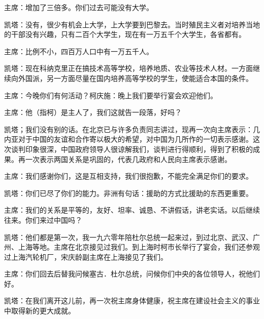主席：增加了三倍多。你们过去可能没有大学。

凯塔：没有，很少有机会上大学，上大学要到巴黎去。当时殖民主义者对培养当地的干部没有兴趣，只有二百个大学生，现在有一万五千个大学生，各省都有。

主席：比例不小，四百万人口中有一万五千人。

凯塔：现在科纳克里正在搞技术高等学校，培养地质、农业等技术人材。一方面继续向外国派，另一方面尽量在国内培养高等学校的学生，使能适合本国的条件。

主席：今晚你们有何活动？柯庆施：晚上我们要举行宴会欢迎他们。

主席：他（指柯）是主人了，我们这就告一段落，好吗？

凯塔；我们没有别的话。在北京已与许多负责同志讲过，现再一次向主席表示：几内亚对于中国的友谊和合作寄以极大的希望，对中国为几所作的一切表示感谢。这次谈判印象很深，中国政府领导人很谅解我们，谈判进行得顺利，得到了积极的成果。再一次表示两国关系是巩固的，代表几政府和人民向主席表示感谢。

主席：我们感谢你们，这是互相支持，我们很抱歉，不能完全满足你们的要求。

凯塔：你们已尽了你们的能力。非洲有句话：援助的方式比援助的东西更重要。

主席：我们的关系是平等的，友好、坦率、诚恳、不讲假话，讲老实话。以后继续往来。你们来过中国吗？

凯塔：他们都是第一次，我一九六零年陪杜尔总统一起来过，到过北京、武汉、广州、上海等地。主席在北京接见过我们。到上海时柯市长举行了宴会，我们还参观过上海汽轮机厂，宋庆龄副主席在上海接见了我们。

主席：你们回去后替我问候塞古．杜尔总统，问候你们中央的各位领导人，祝他们好。

凯塔：在我们离开这儿前，再一次祝主席身体健康，祝主席在建设社会主义的事业中取得新的更大成就。


